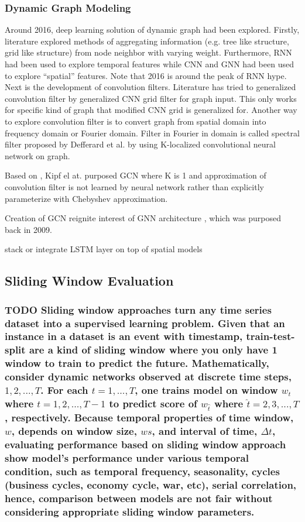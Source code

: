 \documentclass{IEEEtran}
\begin{document}
\subsubsection{Dynamic Graph Modeling}
\label{sec:org266cebd}
Around 2016, deep learning solution of dynamic graph had been explored. Firstly, literature explored methods of aggregating information (e.g. tree like structure, grid like structure) from node neighbor with varying weight. Furthermore, RNN had been used to explore temporal features while CNN and GNN had been used to explore ``spatial'' features. Note that 2016 is around the peak of RNN hype. Next is the development of convolution filters. Literature has tried to generalized convolution filter by generalized CNN grid filter for graph input. This only works for specific kind of graph that modified CNN grid is generalized for. Another way to explore convolution filter is to convert graph from spatial domain into frequency domain or Fourier domain. Filter in Fourier in domain is called spectral filter proposed by Defferard et al. \cite{defferrard2016convolutional} by using K-localized convolutional neural network on graph.


Based on \cite{defferrard2016convolutional}, Kipf el at. \cite{kipf2016semi} purposed GCN where K is 1 and approximation of convolution filter is not learned by neural network rather than explicitly parameterize with Chebyshev approximation.

Creation of GCN reignite interest of GNN architecture \cite{scarselli2008graph}, which was purposed back in 2009.




stack or integrate LSTM layer on top of spatial models
\subsection{Sliding Window Evaluation}
\label{sec:org7fedb06}
\subsubsection{{\bfseries\sffamily TODO} Sliding window approaches turn any time series dataset into a supervised learning problem. Given that an instance in a dataset is an event with timestamp, train-test-split are a kind of sliding window where you only have 1 window to train to predict the future. Mathematically, consider dynamic networks observed at discrete time steps, \(1,2,...,T\). For each \(t = 1,...,T\), one trains model on window \(w_{t}\) where \(t=1,2,...,T-1\) to predict score of \(w_{\hat t}\) where \(\hat t=2,3,...,T\), respectively. Because temporal properties of time window, \(w\), depends on window size, \(ws\), and interval of time, \(\Delta t\), evaluating performance based on sliding window approach show model's performance under various temporal condition, such as temporal frequency, seasonality, cycles (business cycles, economy cycle, war, etc), serial correlation, hence, comparison between models are not fair without considering appropriate sliding window parameters.}
\label{sec:org22d8c23}
\end{document}

